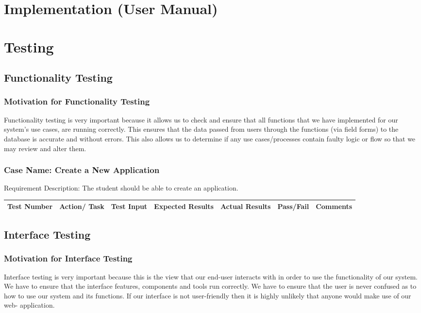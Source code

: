 \documentclass{article}
\begin{document}
\section{Implementation (User Manual)}

\section{Testing}
\subsection{Functionality Testing}
\subsubsection{Motivation for Functionality Testing} 
Functionality testing is very important because it allows us to check and ensure that all functions that we have implemented for our system’s use
cases, are running correctly. This ensures that the data passed from users through the functions (via field forms) to the database is accurate and
without errors. This also allows us to determine if any use cases/processes contain faulty logic or flow so that we may review and alter them. 
\subsubsection{Case Name: Create a New Application} 
Requirement Description: The student should be able to create an application. \\
\begin{tabu} to \textwidth {| X[l] | X[l] | X[l] | X[l] | X[l] | X[l] | X[l]|}
\hline
\textbf{Test Number} & \textbf{Action/ Task} & \textbf{Test Input} & \textbf{Expected Results} & \textbf{Actual Results} & \textbf{Pass/Fail} & \textbf{Comments} \\
\hline
\end{tabu}
\subsection{Interface Testing}
\subsubsection{Motivation for Interface Testing} 
Interface testing is very important because this is the view that our end-user interacts with in order to use the functionality of our system. We have to ensure that the interface features, components and tools run correctly. We have to ensure that the user is never confused as to how to use our system and its functions. If our interface is not user-friendly then it is highly unlikely that anyone would make use of our web-
application.
\end{document}
